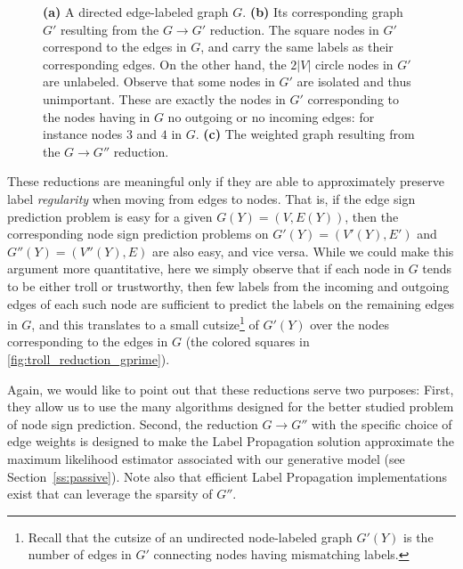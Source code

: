 \begin{figure}[t]
\begin{subfigure}[b]{0.36\textwidth}
    \caption{\label{fig:troll_reduction_gsecond}}
  \end{subfigure}
  \caption{\label{f:etnr}
    \textbf{(a)} A directed edge-labeled graph $G$. \textbf{(b)} Its corresponding graph $G'$
    resulting from the $G\rightarrow G'$ reduction. The square nodes in $G'$ correspond to the
    edges in $G$, and carry the same labels as their corresponding edges. On the other hand, the
    $2|V|$ circle nodes in $G'$ are unlabeled. Observe that some nodes in $G'$ are isolated and
    thus unimportant. These are exactly the nodes in $G'$ corresponding to the nodes having in $G$
    no outgoing or no incoming edges: for instance nodes $3$ and $4$ in $G$. \textbf{(c)} The
    weighted graph resulting from the $G\rightarrow G''$ reduction.
  }
\end{figure}

These reductions are meaningful only if they are able to approximately preserve label
\emph{regularity} when moving from edges to nodes. That is, if the edge sign prediction problem is
easy for a given $G(Y) = (V,E(Y))$, then the corresponding node sign prediction problems on $G'(Y)
= (V'(Y),E')$ and $G''(Y) = (V''(Y),E)$ are also easy, and vice versa.  While we could make this
argument more quantitative, here we simply observe that if each node in $G$ tends to be either
troll or trustworthy, then few labels from the incoming and outgoing edges of each such node are
sufficient to predict the labels on the remaining edges in $G$, and this translates to a small
cutsize\footnote{Recall that the cutsize of an undirected node-labeled graph $G'(Y)$ is the number
of edges in $G'$ connecting nodes having mismatching labels.} of $G'(Y)$ over the nodes
corresponding to the edges in $G$ (the colored squares in \autoref{fig:troll_reduction_gprime}).

Again, we would like to point out that these reductions serve two purposes: First, they allow us to
use the many algorithms designed for the better studied problem of node sign prediction. Second,
the reduction $G\rightarrow G''$ with the specific choice of edge weights is designed to make the
Label Propagation solution approximate the maximum likelihood estimator associated with our
generative model (see Section~\ref{ss:passive}). Note also that efficient Label Propagation
implementations exist that can leverage the sparsity of $G''$.

